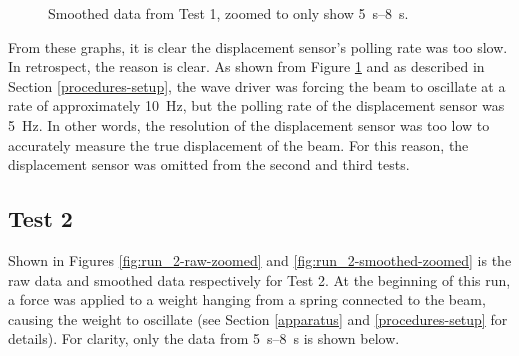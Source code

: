\documentclass[12 pt]{report}
\begin{document}
\begin{figure}[htbp]
\begin{minipage}{0.45\textwidth}
        \caption{Smoothed data from Test 1, zoomed to only show \qtyrange{5}{8}{\s}.}
        \label{fig:run_1-smoothed-zoomed}
    \end{minipage}
\end{figure}

From these graphs, it is clear the displacement sensor's polling rate was too slow. In retrospect, the reason is clear. As shown from Figure \ref{fig:run_1-smoothed-zoomed} and as described in Section \ref{procedures-setup}, the wave driver was forcing the beam to oscillate at a rate of approximately \qty{10}{\hertz}, but the polling rate of the displacement sensor was \qty{5}{\hertz}. In other words, the resolution of the displacement sensor was too low to accurately measure the true displacement of the beam. For this reason, the displacement sensor was omitted from the second and third tests.

\subsection{Test 2} \label{data-test_2}
Shown in Figures \ref{fig:run_2-raw-zoomed} and \ref{fig:run_2-smoothed-zoomed} is the raw data and smoothed data respectively for Test 2. At the beginning of this run, a force was applied to a weight hanging from a spring connected to the beam, causing the weight to oscillate (see Section \ref{apparatus} and \ref{procedures-setup} for details). For clarity, only the data from \qtyrange{5}{8}{\s} is shown below.
\end{document}
